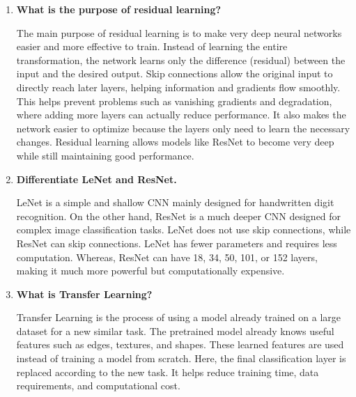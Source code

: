 \documentclass[11pt]{article}
\begin{document}
\begin{enumerate}[leftmargin=*]
    \vspace{3mm}
    
    \item \textbf{What is the purpose of residual learning?}
    
    \vspace{5mm}
    
    The main purpose of residual learning is to make very deep neural networks easier and more effective to train.
    Instead of learning the entire transformation, the network learns only the difference (residual) between the input and the desired output.
    Skip connections allow the original input to directly reach later layers, helping information and gradients flow smoothly.
    This helps prevent problems such as vanishing gradients and degradation, where adding more layers can actually reduce performance.
    It also makes the network easier to optimize because the layers only need to learn the necessary changes.
    Residual learning allows models like ResNet to become very deep while still maintaining good performance.
    
    \vspace{3mm}
    
    \item \textbf{Differentiate LeNet and ResNet.}
    
    \vspace{5mm}
    
    LeNet is a simple and shallow CNN mainly designed for handwritten digit recognition.
    On the other hand, ResNet is a much deeper CNN designed for complex image classification tasks.
    LeNet does not use skip connections, while ResNet can skip connections.
    LeNet has fewer parameters and requires less computation.
    Whereas, ResNet can have 18, 34, 50, 101, or 152 layers, making it much more powerful but computationally expensive.
    
    \vspace{3mm}
    
    \item \textbf{What is Transfer Learning?}
    
    \vspace{5mm}
    
    Transfer Learning is the process of using a model already trained on a large dataset for a new similar task.
    The pretrained model already knows useful features such as edges, textures, and shapes.
    These learned features are used instead of training a model from scratch.
    Here, the final classification layer is replaced according to the new task.
    It helps reduce training time, data requirements, and computational cost.
        

\end{enumerate}
\end{document}
